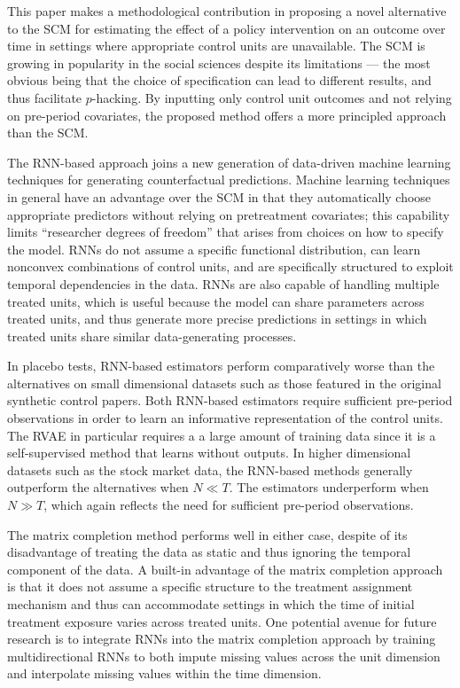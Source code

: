 \documentclass[hidelinks,12pt]{article}
\begin{document}
This paper makes a methodological contribution in proposing a novel alternative to the SCM for estimating the effect of a policy intervention on an outcome over time in settings where appropriate control units are unavailable. The SCM is growing in popularity in the social sciences despite its limitations --- the most obvious being that the choice of specification can lead to different results, and thus facilitate $p$-hacking. By inputting only control unit outcomes and not relying on pre-period covariates, the proposed method offers a more principled approach than the SCM. 

The RNN-based approach joins a new generation of data-driven machine learning techniques for generating counterfactual predictions. Machine learning techniques in general have an advantage over the SCM in that they automatically choose appropriate predictors without relying on pretreatment covariates; this capability limits ``researcher degrees of freedom'' that arises from choices on how to specify the model. RNNs do not assume a specific functional distribution, can learn nonconvex combinations of control units, and are specifically structured to exploit temporal dependencies in the data. RNNs are also capable of handling multiple treated units, which is useful because the model can share parameters across treated units, and thus generate more precise predictions in settings in which treated units share similar data-generating processes. 

In placebo tests, RNN-based estimators perform comparatively worse than the alternatives on small dimensional datasets such as those featured in the original synthetic control papers. Both RNN-based estimators require sufficient pre-period observations in order to learn an informative representation of the control units. The RVAE in particular requires a a large amount of training data since it is a self-supervised method that learns without outputs. In higher dimensional datasets such as the stock market data, the RNN-based methods generally outperform the alternatives when  $N \ll T$. The estimators underperform when $N \gg T$, which again reflects the need for sufficient pre-period observations. 

The matrix completion method performs well in either case, despite of its disadvantage of treating the data as static and thus ignoring the temporal component of the data. A built-in advantage of the matrix completion approach is that it does not assume a specific structure to the treatment assignment mechanism and thus can accommodate settings in which the time of initial treatment exposure varies across treated units. One potential avenue for future research is to integrate RNNs into the matrix completion approach by training multidirectional RNNs \citep[e.g.,][]{yoon2018estimating} to both impute missing values across the unit dimension and interpolate missing values within the time dimension. 
\end{document}

